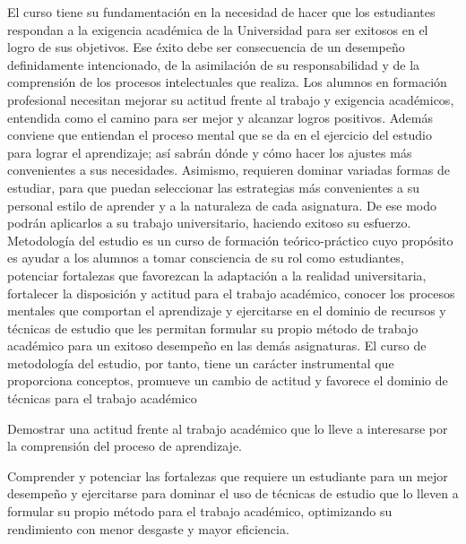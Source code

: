 \begin{syllabus}


\begin{justification}
El curso tiene su fundamentación en la necesidad de hacer que los estudiantes respondan a la exigencia académica de la Universidad para ser exitosos en el logro de sus objetivos. Ese  éxito debe ser consecuencia de un desempeño definidamente intencionado, de la asimilación de su responsabilidad y de la comprensión de los procesos intelectuales que realiza. 
Los alumnos en formación profesional necesitan mejorar su actitud frente al trabajo y exigencia académicos, entendida como el camino para ser mejor y alcanzar logros positivos. Además conviene que entiendan el proceso mental que se da en el ejercicio del estudio para lograr el aprendizaje; así  sabrán dónde y cómo hacer los ajustes más convenientes a sus necesidades. Asimismo, requieren dominar variadas formas de estudiar, para que puedan seleccionar las estrategias  más convenientes a su personal estilo de aprender y a la naturaleza de cada asignatura. De ese modo podrán  aplicarlos a su trabajo universitario, haciendo exitoso su esfuerzo.
Metodología del estudio es un curso de formación teórico-práctico cuyo propósito es  ayudar a los alumnos a  tomar consciencia de su rol como estudiantes, potenciar fortalezas que favorezcan la adaptación a la realidad universitaria, fortalecer la disposición y actitud para el trabajo académico, conocer los procesos mentales que comportan el aprendizaje  y ejercitarse en el dominio de recursos y técnicas de estudio que les permitan formular su propio método de trabajo académico para un exitoso desempeño en las demás asignaturas. El curso de metodología del estudio, por tanto, tiene un carácter instrumental que proporciona conceptos, promueve un cambio de actitud y favorece el dominio de técnicas para el  trabajo académico

\end{justification}

\begin{goals}
\item Demostrar una actitud frente al trabajo académico que lo lleve a interesarse por la comprensión del proceso de aprendizaje.
\item Comprender y potenciar las fortalezas que requiere un estudiante para  un mejor desempeño  y ejercitarse para dominar el uso de  técnicas de estudio que lo lleven a formular su propio método para el trabajo académico, optimizando su rendimiento con menor desgaste y mayor eficiencia.
\end{goals}


\end{syllabus}
